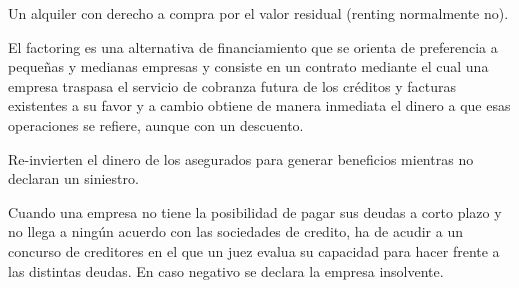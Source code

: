 \begin{mydef}
    Un alquiler con derecho a compra por el valor residual (renting normalmente no).
\end{mydef}

 \begin{mydef}[Factoring]
     El factoring es una alternativa de financiamiento que se orienta de preferencia a pequeñas y medianas empresas y consiste en un contrato mediante el cual una empresa traspasa el servicio de cobranza futura de los créditos y facturas existentes a su favor y a cambio obtiene de manera inmediata el dinero a que esas operaciones se refiere, aunque con un descuento.
 \end{mydef}

\begin{mydef}
    Re-invierten el dinero de los asegurados para generar beneficios mientras no declaran un siniestro.
\end{mydef}


\begin{mydef}
    Cuando una empresa no tiene la posibilidad de pagar sus deudas a corto plazo y no llega a ningún acuerdo con las sociedades de credito, ha de acudir a un concurso de creditores en el que un juez evalua su capacidad para hacer frente a las distintas deudas. En caso negativo se declara la empresa insolvente.
\end{mydef}

